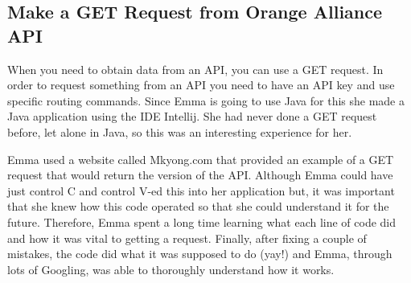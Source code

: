 \documentclass{article}
\begin{document}
\subsection{Make a GET Request from Orange Alliance API}
When you need to obtain data from an API, you can use a GET request. In order to request something from an API you need to have an API key and use specific routing commands. Since Emma is going to use Java for this she made a Java application using the IDE Intellij. She had never done a GET request before, let alone in Java, so this was an interesting experience for her. 

Emma used a website called Mkyong.com that provided an example of a GET request that would return the version of the API. Although Emma could have just control C and control V-ed this into her application but, it was important that she knew how this code operated so that she could understand it for the future. Therefore, Emma spent a long time learning what each line of code did and how it was vital to getting a request. Finally, after fixing a couple of mistakes, the code did what it was supposed to do (yay!) and Emma, through lots of Googling, was able to thoroughly understand how it works. 
\end{document}
